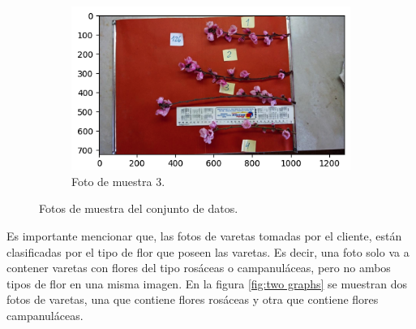 \begin{figure}[!htpb]
\begin{subfigure}[b]{0.4\textwidth}
     \end{subfigure}
     \hfill
     \begin{subfigure}[b]{0.5\textwidth}
         \centering
         \includegraphics[scale=.45]{./Figures/flor_muestra6.png}
         \caption{Foto de muestra 3.}
         \label{fig:3de3}
     \end{subfigure}
        \caption{Fotos de muestra del conjunto de datos.}
        \label{fig:three graphs}
\end{figure}

Es importante mencionar que, las fotos de varetas tomadas por el cliente, están clasificadas por el tipo de flor que poseen las varetas. Es decir, una foto solo va a contener varetas con flores del tipo rosáceas o campanuláceas, pero no ambos tipos de flor en una misma imagen. En la figura \ref{fig:two graphs} se muestran dos fotos de varetas, una que contiene flores rosáceas y otra que contiene flores campanuláceas.

